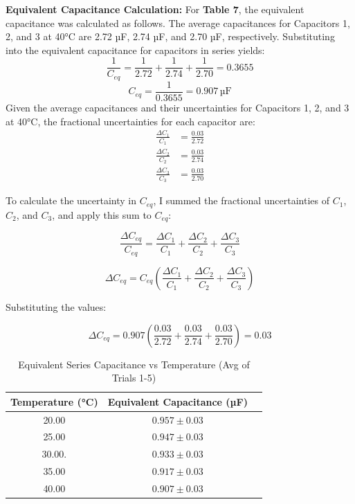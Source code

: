 \documentclass[12pt]{article}
\numberwithin{equation}{section}
\begin{document}
\noindent \textbf{Equivalent Capacitance Calculation:} \noindent For \textbf{Table 7}, the equivalent capacitance was calculated as follows. The average capacitances for Capacitors 1, 2, and 3 at 40°C are 2.72 µF, 2.74 µF, and 2.70 µF, respectively.
Substituting into the equivalent capacitance for capacitors in series yields:
\[
\frac{1}{C_{eq}} = \frac{1}{2.72} + \frac{1}{2.74} + \frac{1}{2.70} = 0.3655
\]
\[
C_{eq} = \frac{1}{0.3655} = 0.907 \, \text{µF}
\]
\noindent Given the average capacitances and their uncertainties for Capacitors 1, 2, and 3 at 40°C, the fractional uncertainties for each capacitor are:
\begin{align*}
    \frac{\Delta C_1}{C_1} &= \frac{0.03}{2.72} \\
    \frac{\Delta C_2}{C_2} &= \frac{0.03}{2.74} \\
    \frac{\Delta C_3}{C_3} &= \frac{0.03}{2.70}
\end{align*}

 \noindent To calculate the uncertainty in \(C_{eq}\), I summed the fractional uncertainties of \(C_1\), \(C_2\), and \(C_3\), and apply this sum to \(C_{eq}\):

\[
\frac{\Delta C_{eq}}{C_{eq}} = \frac{\Delta C_1}{C_1} + \frac{\Delta C_2}{C_2} + \frac{\Delta C_3}{C_3}
\]

\[
\Delta C_{eq} = C_{eq} \left( \frac{\Delta C_1}{C_1} + \frac{\Delta C_2}{C_2} + \frac{\Delta C_3}{C_3} \right)
\]

\noindent Substituting the values:

\[
\Delta C_{eq} = 0.907 \left( \frac{0.03}{2.72} + \frac{0.03}{2.74} + \frac{0.03}{2.70} \right) = 0.03
\]



\FloatBarrier


\begin{table}[ht]
\centering
\caption{Equivalent Series Capacitance vs Temperature (Avg of Trials 1-5)}
\begin{tabular}{@{}ccc@{}}
\toprule
Temperature (°C) & Equivalent Capacitance (µF) \\ \midrule
20.00               & $0.957 \pm 0.03 $           \\
25.00              & $0.947 \pm 0.03$            \\
30.00.               & $0.933 \pm 0.03 $            \\
35.00               & $0.917 \pm 0.03 $            \\
40.00               & $0.907  \pm 0.03 $            \\ \bottomrule
\end{tabular}
\end{table}
\end{document}
